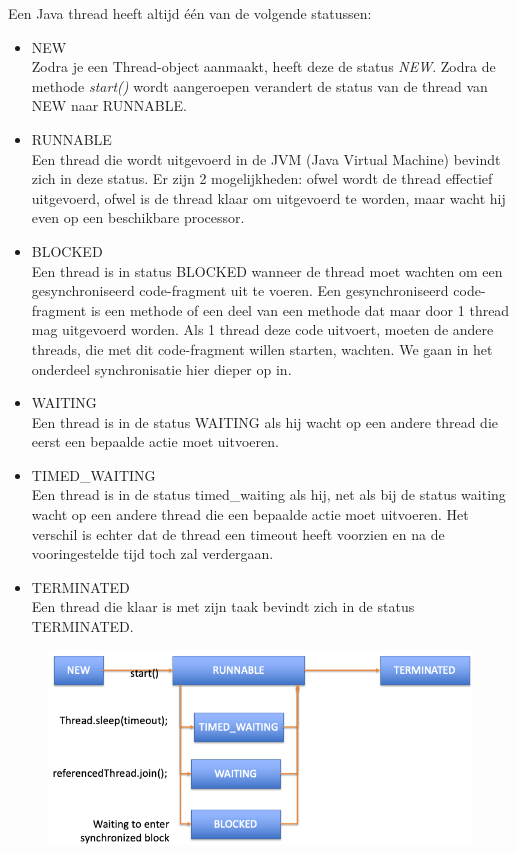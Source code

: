 \documentclass{tstextbook}
\begin{document}
Een Java thread heeft altijd \'e\'en van de volgende statussen:
\begin{itemize}
\item NEW\\
Zodra je een Thread-object aanmaakt, heeft deze de status \textit{NEW}. Zodra de methode \textit{start()} wordt aangeroepen verandert de status van de thread van NEW naar RUNNABLE.
\item RUNNABLE\\
Een thread die wordt uitgevoerd in de JVM (Java Virtual Machine) bevindt zich in deze status. Er zijn 2 mogelijkheden: ofwel wordt de thread effectief uitgevoerd, ofwel is de thread klaar om uitgevoerd te worden, maar wacht hij even op een beschikbare processor.
\item BLOCKED\\
Een thread is in status BLOCKED wanneer de thread moet wachten om een gesynchroniseerd code-fragment uit te voeren. Een gesynchroniseerd code-fragment is een methode of een deel van een methode dat maar door 1 thread mag uitgevoerd worden. Als 1 thread deze code uitvoert, moeten de andere threads, die met dit code-fragment willen starten, wachten. We gaan in het onderdeel synchronisatie hier dieper op in. 
\item WAITING\\
Een thread is in de status WAITING als hij wacht op een andere thread die eerst een bepaalde actie moet uitvoeren.
\item TIMED\_WAITING\\
Een thread is in de status timed\_waiting als hij, net als bij de status waiting wacht op een andere thread die een bepaalde actie moet uitvoeren. Het verschil is echter dat de thread een timeout heeft voorzien en na de vooringestelde tijd toch zal verdergaan.
\item TERMINATED\\
Een thread die klaar is met zijn taak bevindt zich in de status TERMINATED.
\end{itemize}

\begin{figure}[H]
  \includegraphics[width=\linewidth]{images/h9/thread_life_cycle.png}
  \label{fig:thread_life_cycle}
\end{figure}
\end{document}
